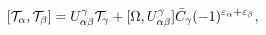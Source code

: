 \begin{equation}\label{5.14}
[{\cal T}_\alpha,{\cal T}_\beta]=U^\gamma_{\alpha\beta}{\cal T}_\gamma+
[\Omega,U^\gamma_{\alpha\beta}]\bar{C}_\gamma
(-1)^{\varepsilon_\alpha+\varepsilon_\beta},
\end{equation}


